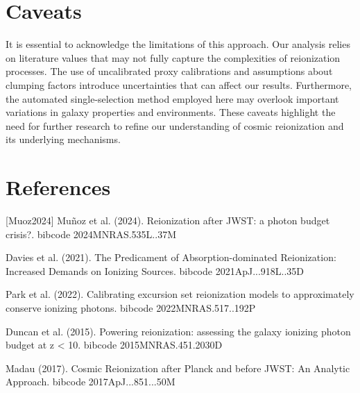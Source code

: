 \documentclass[twocolumn]{aastex631}
\begin{document}
\section{Caveats}
It is essential to acknowledge the limitations of this approach. Our analysis relies on literature values that may not fully capture the complexities of reionization processes. The use of uncalibrated proxy calibrations and assumptions about clumping factors introduce uncertainties that can affect our results. Furthermore, the automated single-selection method employed here may overlook important variations in galaxy properties and environments. These caveats highlight the need for further research to refine our understanding of cosmic reionization and its underlying mechanisms.
\section*{References}
\footnotesize
[Muoz2024] Muñoz et al. (2024). Reionization after JWST: a photon budget crisis?. bibcode 2024MNRAS.535L..37M \par [Davies2021] Davies et al. (2021). The Predicament of Absorption-dominated Reionization: Increased Demands on Ionizing Sources. bibcode 2021ApJ...918L..35D \par [Park2022] Park et al. (2022). Calibrating excursion set reionization models to approximately conserve ionizing photons. bibcode 2022MNRAS.517..192P \par [Duncan2015] Duncan et al. (2015). Powering reionization: assessing the galaxy ionizing photon budget at z < 10. bibcode 2015MNRAS.451.2030D \par [Madau2017] Madau (2017). Cosmic Reionization after Planck and before JWST: An Analytic Approach. bibcode 2017ApJ...851...50M
\end{document}
